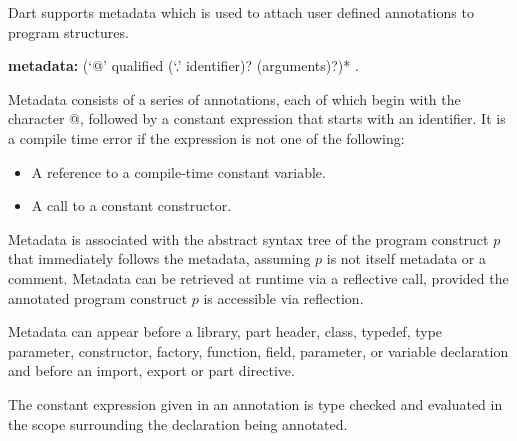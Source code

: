 \documentclass{article}
\begin{document}
\LMHash{}
Dart supports metadata which is used to attach user defined annotations to program structures.

\begin{grammar}
{\bf metadata:}
      (`@' qualified ({\escapegrammar `.'} identifier)? (arguments)?)*
    .
\end{grammar}

\LMHash{}
Metadata consists of a series of annotations, each of which begin with the character @, followed by  a constant expression that starts with an identifier. It is a compile time error if the expression is not one of the following:
\begin{itemize}
\item A reference to a compile-time constant variable.
\item A call to a constant constructor.
\end{itemize}

\LMHash{}
Metadata is associated with the abstract syntax tree of the program construct $p$ that immediately follows the metadata, assuming $p$ is not itself metadata or a comment. Metadata can be retrieved at runtime via a reflective call, provided the annotated program construct $p$ is accessible via reflection.




\LMHash{}
Metadata can appear before a library, part header, class, typedef, type parameter, constructor, factory, function, field, parameter, or variable declaration and before an import, export or part directive.

\LMHash{}
The constant expression given in an annotation  is type checked and evaluated in the scope surrounding the declaration being annotated.
\end{document}
